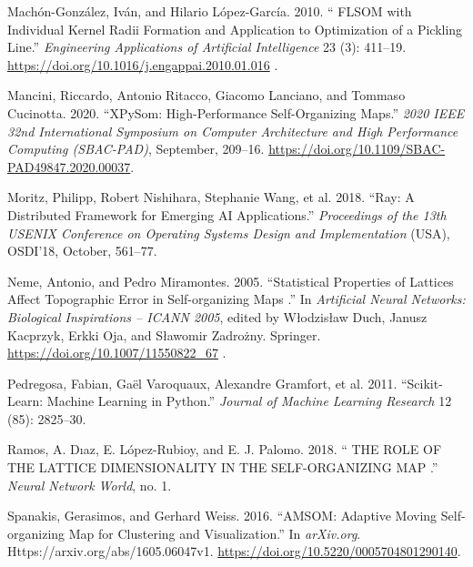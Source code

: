 \documentclass[
]{article}
\newlength{\cslhangindent}
\newenvironment{CSLReferences}[2] %
 {\begin{list}{}{%
  \setlength{\itemindent}{0pt}
  \setlength{\leftmargin}{0pt}
  \setlength{\parsep}{0pt}
  \ifodd #1
   \setlength{\leftmargin}{\cslhangindent}
   \setlength{\itemindent}{-1\cslhangindent}
  \fi
  \setlength{\itemsep}{#2\baselineskip}}}
 {\end{list}}
\providecommand{\DIFadd}[1]{{\protect\color{blue} #1}} %
\providecommand{\DIFaddbegin}{} %
\providecommand{\DIFaddend}{} %
\begin{document}
\begin{CSLReferences}{1}{1}
\DIFaddbegin {}
\DIFadd{Machón-González, Iván, and Hilario López-García. 2010. }{\DIFadd{``}{\DIFadd{FLSOM}} \DIFadd{with
Individual Kernel Radii Formation and Application to Optimization of a
Pickling Line.''}} \DIFadd{\emph{Engineering Applications of Artificial
Intelligence} 23 (3): 411--19.
}\url{https://doi.org/10.1016/j.engappai.2010.01.016}\DIFadd{.
}

\DIFaddend {}
Mancini, Riccardo, Antonio Ritacco, Giacomo Lanciano, and Tommaso
Cucinotta. 2020. {``{XPySom}: {High-Performance Self-Organizing
Maps}.''} \emph{2020 {IEEE} 32nd {International Symposium} on {Computer
Architecture} and {High Performance Computing} ({SBAC-PAD})}, September,
209--16. \url{https://doi.org/10.1109/SBAC-PAD49847.2020.00037}.

Moritz, Philipp, Robert Nishihara, Stephanie Wang, et al. 2018. {``Ray:
A Distributed Framework for Emerging {AI} Applications.''}
\emph{Proceedings of the 13th {USENIX} Conference on {Operating Systems
Design} and {Implementation}} (USA), {OSDI}'18, October, 561--77.

\DIFaddbegin {}
\DIFadd{Neme, Antonio, and Pedro Miramontes. 2005. }{\DIFadd{``Statistical }{\DIFadd{Properties}}
\DIFadd{of }{\DIFadd{Lattices Affect Topographic Error}} \DIFadd{in }{\DIFadd{Self-organizing Maps}}\DIFadd{.''}} \DIFadd{In
\emph{Artificial {Neural Networks}: {Biological Inspirations} -- {ICANN}
2005}, edited by Włodzisław Duch, Janusz Kacprzyk, Erkki Oja, and
Sławomir Zadrożny. Springer. }\url{https://doi.org/10.1007/11550822_67}\DIFadd{.
}

\DIFaddend {}
Pedregosa, Fabian, Gaël Varoquaux, Alexandre Gramfort, et al. 2011.
{``Scikit-Learn: {Machine Learning} in {Python}.''} \emph{Journal of
Machine Learning Research} 12 (85): 2825--30.

\DIFaddbegin {}
\DIFadd{Ramos, A. Dıaz, E. López-Rubioy, and E. J. Palomo. 2018. }{\DIFadd{``}{\DIFadd{THE ROLE OF
THE LATTICE DIMENSIONALITY IN THE SELF-ORGANIZING MAP}}\DIFadd{.''}} \DIFadd{\emph{Neural
Network World}, no. 1.
}

\DIFaddend {}
Spanakis, Gerasimos, and Gerhard Weiss. 2016. {``{AMSOM}: {Adaptive
Moving Self-organizing Map} for {Clustering} and {Visualization}.''} In
\emph{arXiv.org}. Https://arxiv.org/abs/1605.06047v1.
\url{https://doi.org/10.5220/0005704801290140}.


\end{CSLReferences}
\end{document}
